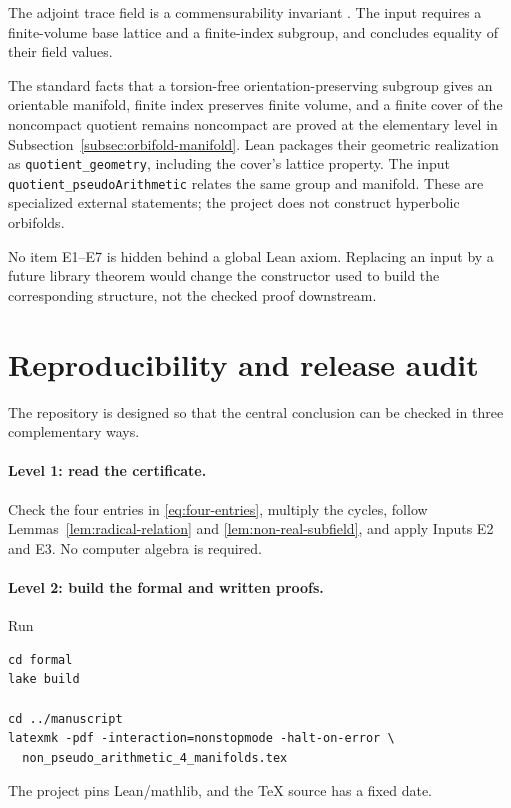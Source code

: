\documentclass[11pt]{article}
\numberwithin{equation}{section}
\theoremstyle{definition}
\theoremstyle{remark}
\newcommand{\code}[1]{\texttt{#1}}
\begin{document}
\begin{description}[style=nextline]
\item[\textbf{E6: Finite-index trace-field invariance.}]
The adjoint trace field is a commensurability invariant
\cite{VinbergRings}.  The input  requires
a finite-volume base lattice and a finite-index subgroup, and concludes
equality of their field values.

\item[\textbf{E7: Finite-cover quotient geometry.}]
The standard facts that a torsion-free orientation-preserving subgroup gives
an orientable manifold, finite index preserves finite volume, and a finite
cover of the noncompact quotient remains noncompact are proved at the
elementary level in Subsection~\ref{subsec:orbifold-manifold}.  Lean packages
their geometric realization as \code{quotient\_geometry}, including the
cover's lattice property.  The input \code{quotient\_pseudoArithmetic}
relates the same group and manifold.  These are specialized external
statements; the project does not construct hyperbolic orbifolds.
\end{description}

No item E1--E7 is hidden behind a global Lean axiom.  Replacing an input by a
future library theorem would change the constructor used to build the
corresponding structure, not the checked proof downstream.

\section{Reproducibility and release audit}
\label{sec:reproducibility}

The repository is designed so that the central conclusion can be checked in
three complementary ways.

\paragraph{Level 1: read the certificate.}
Check the four entries in \eqref{eq:four-entries}, multiply the cycles,
follow Lemmas~\ref{lem:radical-relation} and
\ref{lem:non-real-subfield}, and apply Inputs E2 and E3.  No computer algebra
is required.

\paragraph{Level 2: build the formal and written proofs.}
Run
\begin{verbatim}
cd formal
lake build

cd ../manuscript
latexmk -pdf -interaction=nonstopmode -halt-on-error \
  non_pseudo_arithmetic_4_manifolds.tex
\end{verbatim}
The project pins Lean/mathlib, and the TeX source has a fixed date.
\end{document}
